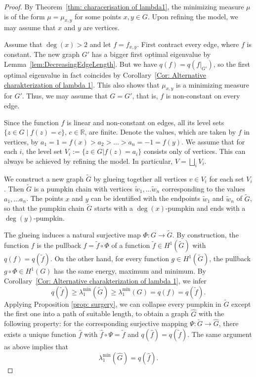 \documentclass[10pt,a4paper]{amsart}
\newcommand{\R}{\mathbb{R}}     %
\begin{document}
\begin{proof}
	By Theorem~\ref{thm: characerisation of lambda1}, the minimizing measure $\mu$ is of the form $\mu = \mu_{x,y}$ for some points $x, y\in G$. Upon refining the model, we may assume that $x$ and $y$ are vertices.
	
	
	Assume that $\deg(x) > 2$ and let $f=f_{x,y}$. First contract every edge, where $f$ is constant. The new graph $G'$ has a bigger first optimal eigenvalue by Lemma~\ref{lem:DecreasingEdgeLength}. But we have $q(f) = q(f|_{G'})$, so the first optimal eigenvalue in fact coincides by Corollary~\ref{Cor: Alternative charakterization of lambda 1}. This also shows that $\mu_{x,y}$ is a minimizing measure for $G'$. Thus, we may assume that $G=G'$, that is, $f$ is non-constant on every edge.
	
	Since the function $f$ is linear and non-constant on edges, all its level sets $\{z \in G\; | \; f(z)=c\}$, $ c \in \R$, are finite. Denote the values, which are taken by $f$ in vertices, by $a_1 = 1 = f(x) > a_2 > \dots > a_n = -1 = f(y)$. We assume that for each $i$, the level set $V_i := \{z \in G | f(z) = a_i\}$ consists only of vertices. This can always be achieved by refining the model. In particular, $V = \bigsqcup_i V_i$.
	

	
	We construct a new graph $\widetilde G$ by glueing together all vertices $v \in V_i$ for each set $V_i$. Then $\widetilde G$ is a pumpkin chain with vertices $\widetilde w_1, \dots \widetilde w_n$ corresponding to the values $a_1, \dots a_n$. The points $x$ and $y$ can be identified with the endpoints $\widetilde w_1$ and $\widetilde w_n$ of $\widetilde G$, so that the pumpkin chain $\widetilde G$ starts with a $\deg(x)$-pumpkin and ends with a $\deg(y)$-pumpkin.
	
	
	
	The glueing induces a natural surjective map $\Phi\colon G \to \widetilde{G}$. By construction, the function $f$ is the pullback $f = \widetilde{ f} \circ \Phi $ of a function $\widetilde f \in H^1(\widetilde G)$ with $q(f) = q(\widetilde{ f})$. On the other hand, for every function $g \in H^1(\widetilde{G})$, the pullback $g \circ \Phi \in H^1(G)$ has the same energy, maximum and minimum. By Corollary~\ref{Cor: Alternative charakterization of lambda 1}, we infer
	\[
	q(\widetilde{ f})	\geq \lambda_{1}^{\min}(\widetilde{G}) \geq \lambda_{1}^{\min}(G) = q(f) = q(\widetilde{ f}).
	\]
	Applying Proposition \ref{prop: surgery}, we can collapse every pumpkin in $\widetilde G$ except the first one into a path of suitable length, to obtain a graph $\widehat{G}$ with the following property: for the corresponding surjective mapping $\Psi\colon \widetilde{G} \to \widehat{G}$, there exists a unique function $\widehat{f}$ with $\widehat{f} \circ \Psi = \widetilde{ f}$ and $q(\widehat{f}) = q(\widetilde{ f})$. The same argument as above implies that
	\[
	\lambda_{1}^{\min}(\widehat{G}) = q(\widehat{f}). 
	\]
	

\end{proof}
\end{document}
